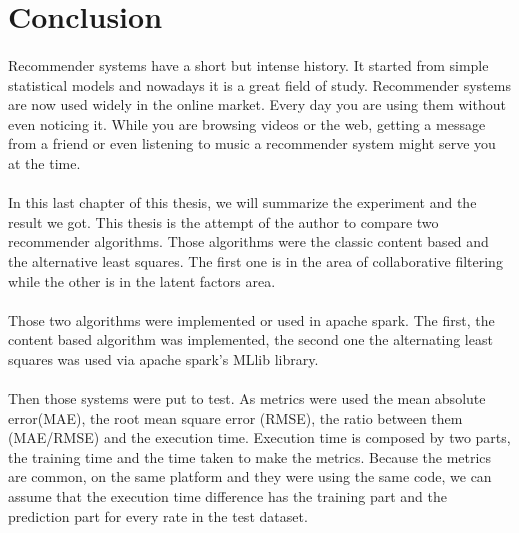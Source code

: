 \newpage
\section{Conclusion}
\paragraph{}Recommender systems have a short but intense history. It started from simple statistical models and nowadays it is a great field of study. Recommender systems are now used widely in the online market. Every day you are using them without even noticing it. While you are browsing videos or the web, getting a message from a friend or even listening to music a recommender system might serve you at the time.

\paragraph{} In this last chapter of this thesis, we will summarize the experiment and the result we got. This thesis is the attempt of the author to compare two recommender algorithms. Those algorithms were the classic content based and the alternative least squares. The first one is in the area of collaborative filtering while the other is in the latent factors area.

\paragraph{} Those two algorithms were implemented or used in apache spark. The first, the content based algorithm was implemented, the second one the alternating least squares was used via apache spark's MLlib library.

\paragraph{} Then those systems were put to test. As metrics were used the mean absolute error(MAE), the root mean square error (RMSE), the ratio between them (MAE/RMSE) and the execution time. Execution time is composed by two parts, the training time and the time taken to make the metrics. Because the metrics are common, on the same platform and they were using the same code, we can assume that the execution time difference has the training part and the prediction part for every rate in the test dataset.
